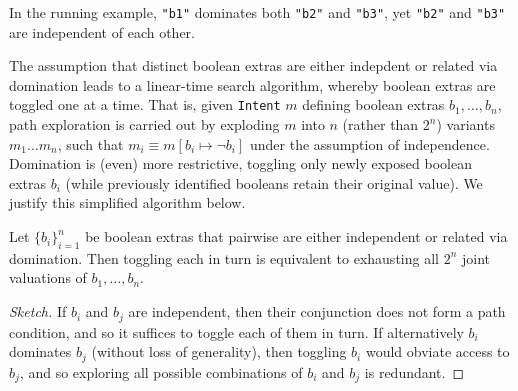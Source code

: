 In the running example, {\tt "b1"} dominates both {\tt "b2"} and {\tt "b3"}, yet {\tt "b2"} and {\tt "b3"} are independent of each other.

The assumption that distinct boolean extras are either indepdent or related via domination leads to a linear-time search algorithm, whereby boolean extras are toggled one at a time. That is, given {\tt Intent}  $m$ defining boolean extras $b_1,\ldots,b_n$, path exploration is carried out by exploding $m$ into $n$ (rather than $2^n$) variants $m_1 \ldots m_n$, such that $m_i \equiv m[ b_i \mapsto \neg b_i ]$ under the assumption of independence. Domination is (even) more restrictive, toggling only newly exposed boolean extras $b_i$ (while previously identified booleans retain their original value). We justify this simplified algorithm below.

\begin{lemma} Let $\{ b_i \}_{i=1}^n$ be boolean extras that pairwise are either independent or related via domination. Then toggling each in turn is equivalent to exhausting all $2^n$ joint valuations of $b_1,\ldots,b_n$.
\begin{proof}[Sketch]
If $b_i$ and $b_j$ are independent, then their conjunction does not form a path condition, and so it suffices to toggle each of them in turn. If alternatively $b_i$ dominates $b_j$ (without loss of generality), then toggling $b_i$ would obviate access to $b_j$, and so exploring all possible combinations of $b_i$ and $b_j$ is redundant.
\end{proof}
\end{lemma}




